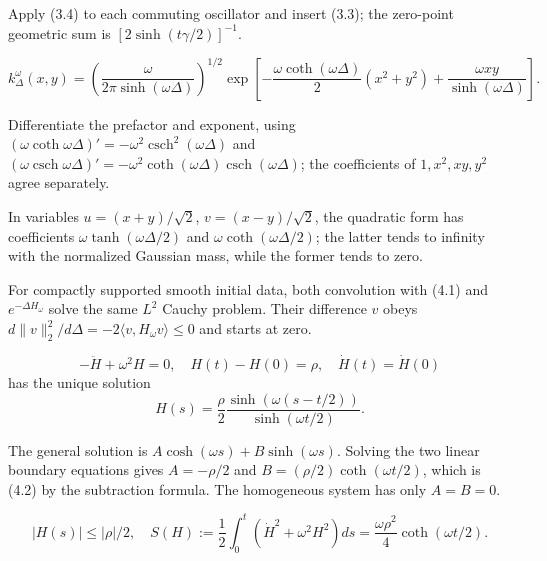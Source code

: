 \documentclass[11pt,a4paper]{article}
\begin{document}
\Because Apply (3.4) to each commuting oscillator and insert (3.3); the zero-point
geometric sum is $[2\sinh(t\gamma/2)]^{-1}$.

\QedStep


\[
 k_\Delta^{\omega}(x,y)=
 \left(\frac{\omega}{2\pi\sinh(\omega\Delta)}\right)^{1/2}
 \exp\left[-\frac{\omega\coth(\omega\Delta)}2(x^2+y^2)
 +\frac{\omega xy}{\sinh(\omega\Delta)}\right].\tag{4.1}
\]


\Because Differentiate the prefactor and exponent, using
$(\omega\coth\omega\Delta)'=-\omega^2\operatorname{csch}^2(\omega\Delta)$ and
$(\omega\operatorname{csch}\omega\Delta)'=-\omega^2\coth(\omega\Delta)
\operatorname{csch}(\omega\Delta)$; the coefficients of
$1,x^2,xy,y^2$ agree separately.


\Because In variables $u=(x+y)/\sqrt2$, $v=(x-y)/\sqrt2$, the quadratic form
has coefficients $\omega\tanh(\omega\Delta/2)$ and
$\omega\coth(\omega\Delta/2)$; the latter tends to infinity with the normalized
Gaussian mass, while the former tends to zero.


\Because For compactly supported smooth initial data, both convolution with (4.1)
and $e^{-\Delta H_\omega}$ solve the same $L^2$ Cauchy problem.  Their difference
$v$ obeys $d\|v\|_2^2/d\Delta=-2\langle v,H_\omega v\rangle\le0$ and starts at zero.

\[
 -\ddot H+\omega^2H=0,\quad H(t)-H(0)=\rho,\quad \dot H(t)=\dot H(0)
\]
has the unique solution
\[
 H(s)=\frac\rho2\frac{\sinh(\omega(s-t/2))}{\sinh(\omega t/2)}.
\tag{4.2}
\]

\Because The general solution is $A\cosh(\omega s)+B\sinh(\omega s)$.  Solving the
two linear boundary equations gives $A=-\rho/2$ and
$B=(\rho/2)\coth(\omega t/2)$, which is (4.2) by the subtraction formula.
The homogeneous system has only $A=B=0$.

\[
 |H(s)|\le|\rho|/2,\quad
 S(H):=\frac12\int_0^t(\dot H^2+\omega^2H^2)ds
 =\frac{\omega\rho^2}{4}\coth(\omega t/2).\tag{4.3}
\]
\end{document}
